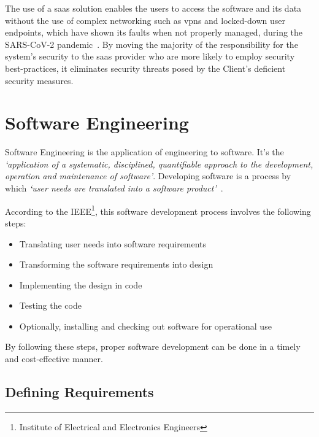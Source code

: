 The use of a \gls{saas} solution enables the users to access the software and its data without the use of complex networking such as \glspl{vpn} and locked-down user endpoints, which have shown its faults when not properly managed, during the SARS-CoV-2 pandemic~\Parencite{adams_al_shahery_chmiel_cunliffe_day_fay_gardner_giuliani_goddard_karl_2022}. By moving the majority of the responsibility for the system's security to the \gls{saas} provider who are more likely to employ security best-practices, it eliminates security threats posed by the Client's deficient security measures.




\section{Software Engineering}\label{state-of-the-art:s:software-engineering}

Software Engineering is the application of engineering to software. It's the \textit{`application of a systematic, disciplined, quantifiable approach to the development, operation and maintenance of software'}. Developing software is a process by which \textit{`user needs are translated into a software product'}~\Parencite{8016712}.

According to the IEEE\footnote{Institute of Electrical and Electronics Engineers\label{foot:ieee}}, this software development process involves the following steps:

\begin{itemize}

    \item Translating user needs into software requirements
    \item Transforming the software requirements into design
    \item Implementing the design in code
    \item Testing the code
    \item Optionally, installing and checking out software for operational use   
\end{itemize}

By following these steps, proper software development can be done in a timely and cost-effective manner.

\subsection{Defining Requirements}\label{state-of-the-art:ss:defining-requirements}

